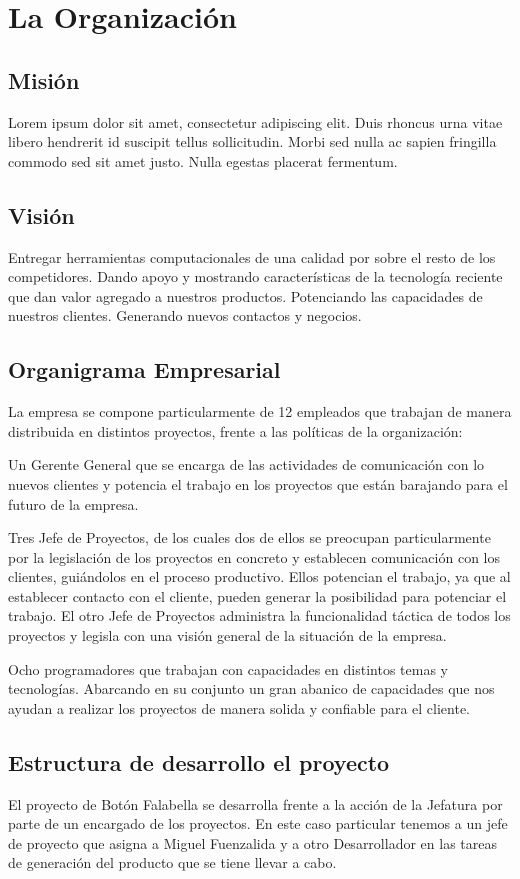 \documentclass[a4paper,12pt,openany,oneside]{book}
\begin{document}
\chapter{La Organización}
\thispagestyle{empty}
\section{Misión}
Lorem ipsum dolor sit amet, consectetur adipiscing elit. Duis rhoncus urna vitae libero hendrerit id suscipit tellus sollicitudin. Morbi sed nulla ac sapien fringilla commodo sed sit amet justo. Nulla egestas placerat fermentum.
\section{Visión}
Entregar herramientas computacionales de una calidad por sobre el resto de los competidores. Dando apoyo y mostrando características de la tecnología reciente que dan valor agregado a nuestros productos. Potenciando las capacidades de nuestros clientes. Generando nuevos contactos y negocios.
\section{Organigrama Empresarial}
La empresa se compone particularmente de 12 empleados que trabajan de manera distribuida en distintos proyectos, frente a las políticas de la organización:

Un Gerente General que se encarga de las actividades de comunicación con lo nuevos clientes y potencia el trabajo en los proyectos que están barajando para el futuro de la empresa.

Tres Jefe de Proyectos, de los cuales dos de ellos se preocupan particularmente por la legislación de los proyectos en concreto y establecen comunicación con los clientes, guiándolos en el proceso productivo. Ellos potencian el trabajo, ya que al establecer contacto con el cliente, pueden generar la posibilidad para potenciar el trabajo. El otro Jefe de Proyectos administra la funcionalidad táctica de todos los proyectos y legisla con una visión general de la situación de la empresa.

Ocho programadores que trabajan con capacidades en distintos temas y tecnologías. Abarcando en su conjunto un gran abanico de capacidades que nos ayudan a realizar los proyectos de manera solida y confiable para el cliente.
\section{Estructura de desarrollo el proyecto}
El proyecto de Botón Falabella se desarrolla frente a la acción de la Jefatura por parte de un encargado de los proyectos. En este caso particular tenemos a un jefe de proyecto que asigna a Miguel Fuenzalida y a otro Desarrollador en las tareas de generación del producto que se tiene llevar a cabo.
\end{document}
